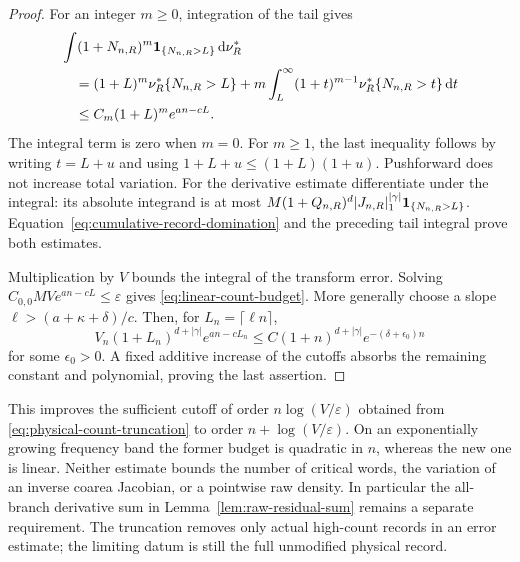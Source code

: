 \begin{proof}
For an integer $m\ge0$, integration of the tail gives
\begin{align*}
 &\int (1+N_{n,R})^m\mathbf1_{\{N_{n,R}>L\}}\,\mathrm d\nu_R^*\\
 &\quad=(1+L)^m\nu_R^*\{N_{n,R}>L\}
    +m\int_L^\infty(1+t)^{m-1}\nu_R^*\{N_{n,R}>t\}\,\mathrm d t\\
 &\quad\le C_m(1+L)^m e^{an-cL}.
\end{align*}
The integral term is zero when $m=0$. For $m\ge1$, the last inequality
follows by writing $t=L+u$ and using
$1+L+u\le(1+L)(1+u)$. Pushforward does not increase total variation.
For the derivative estimate differentiate under the integral: its
absolute integrand is at most
$M(1+Q_{n,R})^d|J_{n,R}|_1^{|\gamma|}
\mathbf1_{\{N_{n,R}>L\}}$. Equation~\eqref{eq:cumulative-record-domination}
and the preceding tail integral prove both estimates.

Multiplication by $V$ bounds the integral of the transform error. Solving
$C_{0,0}MV e^{an-cL}\le\varepsilon$ gives
\eqref{eq:linear-count-budget}. More generally choose a slope
$\ell>(a+\kappa+\delta)/c$. Then, for $L_n=\lceil\ell n\rceil$,
\[
 V_n(1+L_n)^{d+|\gamma|}e^{an-cL_n}
       \le C(1+n)^{d+|\gamma|}e^{-(\delta+\epsilon_0)n}
\]
for some $\epsilon_0>0$. A fixed additive increase of the cutoffs absorbs
the remaining constant and polynomial, proving the last assertion.
\end{proof}

\begin{remark}
This improves the sufficient cutoff of order
$n\log(V/\varepsilon)$ obtained from
\eqref{eq:physical-count-truncation} to order
$n+\log(V/\varepsilon)$. On an exponentially growing frequency band the
former budget is quadratic in $n$, whereas the new one is linear.
Neither estimate bounds the number of critical words, the variation of
an inverse coarea Jacobian, or a pointwise raw density. In particular the
all-branch derivative sum in Lemma~\ref{lem:raw-residual-sum} remains a
separate requirement. The truncation removes only actual high-count
records in an error estimate; the limiting datum is still the full
unmodified physical record.
\end{remark}
